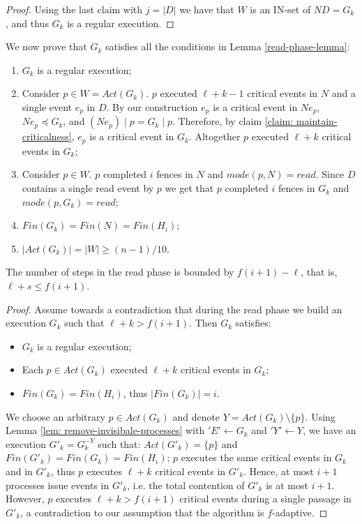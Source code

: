 \begin{proof}
	Using the last claim with $j = |D|$ we have that $W$ is an IN-set of $N D = G_k$, and thus $G_k$ is a regular execution.
\end{proof}
	
We now prove that $G_k$ satisfies all the conditions in Lemma \ref{read-phase-lemma}:
\begin{enumerate}[(1)]
	\item $G_k$ is a regular execution;
	\item Consider $p \in W = Act(G_k)$. $p$ executed $\ell+k-1$ critical events in $N$ and a single event $e_p$ in $D$. By our construction $e_p$ is a critical event in $N e_p$, $N e_p \preceq G_k$, and $(N e_p) \mid p = G_k \mid p$. Therefore, by claim \ref{claim: maintain-criticalness}, $e_p$ is a critical event in $G_k$. Altogether $p$ executed $\ell+k$ critical events in $G_k$;
	\item Consider $p \in W$. $p$ completed $i$ fences in $N$ and $mode(p,N) = read$. Since $D$ contains a single read event by $p$ we get that $p$ completed $i$ fences in $G_k$ and $mode(p,G_k) = read$;
	\item $Fin(G_k) = Fin(N) = Fin(H_i)$;
	\item $|Act(G_k)| = |W| \geq (n-1)/10$.
\end{enumerate}

\begin{claim-section} \label{claim: read-upper-bound}
	The number of steps in the read phase is bounded by $f(i+1)-\ell$, that is, $\ell+s \leq f(i+1)$.
\end{claim-section}

\begin{proof}
	Assume towards a contradiction that during the read phase we build an execution $G_k$ such that $\ell+k > f(i+1)$. Then $G_k$ satisfies:
	\begin{itemize}
		\item $G_k$ is a regular execution;
		\item Each $p \in Act(G_k)$ executed $\ell+k$ critical events in $G_k$;
		\item $Fin(G_k) = Fin(H_i)$, thus $|Fin(G_k)| = i$.
	\end{itemize}
	We choose an arbitrary $p \in Act(G_k)$ and denote $Y = Act(G_k) \setminus \{p\}$. Using Lemma \ref{lem: remove-invisibale-processes} with $'E' \leftarrow G_k$ and $'Y' \leftarrow Y$, we have an execution $G'_k = G_k^{-Y}$ such that: $Act(G'_k) = \{p\}$ and $Fin(G'_k) = Fin(G_k) = Fin(H_i)$; $p$ executes the same critical events in $G_k$ and in $G'_k$, thus $p$ executes $\ell+k$ critical events in $G'_k$. Hence, at most $i+1$ processes issue events in $G'_k$, i.e. the total contention of $G'_k$ is at most $i+1$. However, $p$ executes $\ell+k > f(i+1)$ critical events during a single passage in $G'_k$, a contradiction to our assumption that the algorithm is $f$-adaptive.
\end{proof}






